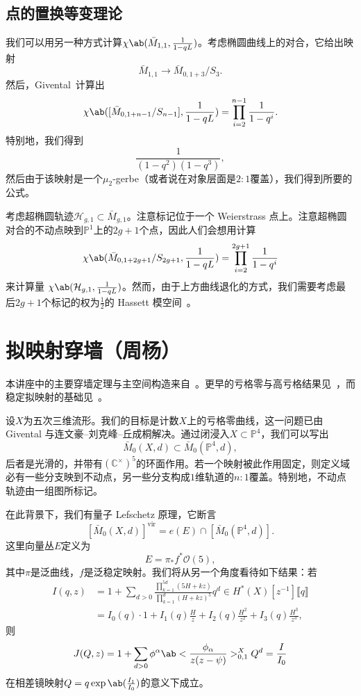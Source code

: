 \documentclass{amsart}
\theoremstyle{definition}
\theoremstyle{remark}
\theoremstyle{plain}
\theoremstyle{definition}
\theoremstyle{remark}
\newcommand{\C}{\mathbb{C}}
\renewcommand{\P}{\mathbb{P}}
\newcommand{\mc}[1]{\mathcal{#1}}
\newcommand{\on}[1]{\operatorname{#1}}
\newcommand{\1}{\mathbf{1}}
\newcommand{\2}{\mathbf{2}}
\newcommand{\3}{\mathbf{3}}
\newcommand{\ps}[1]{\llbracket #1 \rrbracket}
\begin{document}
\subsection{点的置换等变理论}%
\label{sub:Permutation-equivariant theory of a point}

我们可以用另一种方式计算\(\chi\ab(\bar{M}_{1,1}, \frac{1}{1-q L})\)。考虑椭圆曲线上的对合，它给出映射
\[ \bar{M}_{1,1} \to \bar{M}_{0,1+3}/S_3. \]
然后，Givental~\cite{Givental2017K1}计算出
\[ \chi\ab([\bar{M}_{0,1+n-1}/S_{n-1}], \frac{1}{1-qL}) = \prod_{i=2}^{n-1} \frac{1}{1-q^i}. \]
特别地，我们得到
\[ \frac{1}{(1-q^2)(1-q^3)}, \]
然后由于该映射是一个\(\mu_2\)-gerbe（或者说在对象层面是\(2:1\)覆盖），我们得到所要的公式。

考虑超椭圆轨迹\(\mc{H}_{g,1} \subset \bar{M}_{g,1}\)。注意标记位于一个 Weierstrass 点上。注意超椭圆对合的不动点映到\(\P^1\)上的\(2g+1\)个点，因此人们会想用计算
\[ \chi\ab(\bar{M}_{0,1+2g+1}/S_{2g+1}, \frac{1}{1-q L}) = \prod_{i=2}^{2g+1} \frac{1}{1-q^i} \]
来计算量
\(\chi\ab(\mc{H}_{g,1}, \frac{1}{1-qL})\)。然而，由于上方曲线退化的方式，我们需要考虑最后\(2g+1\)个标记的权为\(\frac{1}{2}\)的 Hassett 模空间~\cite{Hassett2003}。







\section{拟映射穿墙（周杨）}%
\label{sec:Quasimap wall-crossing (Yang Zhou)}

本讲座中的主要穿墙定理与主空间构造来自~\cite{Zhou2022}。更早的亏格零与高亏格结果见~\cite{CFK2014,CFK2020}，而稳定拟映射的基础见~\cite{CFKM2014}。

设\(X\)为五次三维流形。我们的目标是计数\(X\)上的亏格零曲线，这一问题已由 Givental 与连文豪–刘克峰–丘成桐解决。通过闭浸入\(X \subset \P^4\)，我们可以写出
\[ \bar{M}_0(X, d) \subset \bar{M}_0(\P^4, d), \]
后者是光滑的，并带有\((\C^{\times})^5\)的环面作用。若一个映射被此作用固定，则定义域必有一些分支映到不动点，另一些分支构成\(1\)维轨道的\(n :1\)覆盖。特别地，不动点轨迹由一组图所标记。

在此背景下，我们有量子 Lefschetz 原理，它断言
\[ [\bar{M}_0(X, d)]^{\on{vir}} = e(E) \cap [\bar{M}_0(\P^4, d)]. \]
这里向量丛\(E\)定义为
\[ E = \pi_* f^* \mc{O}(5), \]
其中\(\pi\)是泛曲线，\(f\)是泛稳定映射。我们将从另一个角度看待如下结果：若
\begin{align*}
    I(q, z) &= 1 + \sum_{d > 0} \frac{\prod_{k=1}^{5d} (5H+kz)}{\prod_{k=1}^d (H+kz)^5} q^d \in H^*(X)[z^{-1}] \ps{q} \\
    &= I_0(q) \cdot 1 + I_1(q) \frac{H}{z} + I_2(q) \frac{H^2}{z^2} + I_3(q) \frac{H^3}{z^3},
\end{align*}
则
\[ J (Q, z) = 1+ \sum_{d>0} \phi^{\alpha} \ab<\frac{\phi_{\alpha}}{z(z-\psi)}>_{0,1}^X Q^d = \frac{I}{I_0} \]
在相差镜映射\(Q = q \exp\ab(\frac{I_1}{I_0})\)的意义下成立。
\end{document}
